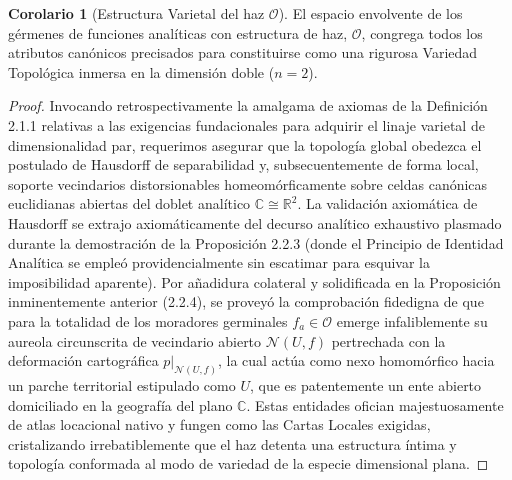 \documentclass[11pt,a4paper]{article}
\theoremstyle{definition}
\newtheorem{corolario}{Corolario}[section]
\theoremstyle{remark}
\numberwithin{equation}{section}
\begin{document}
\begin{corolario}[Estructura Varietal del haz $\mathcal{O}$]
El espacio envolvente de los gérmenes de funciones analíticas con estructura de haz, $\mathcal{O}$, congrega todos los atributos canónicos precisados para constituirse como una rigurosa Variedad Topológica inmersa en la dimensión doble ($n=2$).
\end{corolario}
\begin{proof}
Invocando retrospectivamente la amalgama de axiomas de la Definición 2.1.1 relativas a las exigencias fundacionales para adquirir el linaje varietal de dimensionalidad par, requerimos asegurar que la topología global obedezca el postulado de Hausdorff de separabilidad y, subsecuentemente de forma local, soporte vecindarios distorsionables homeomórficamente sobre celdas canónicas euclidianas abiertas del doblet analítico $\mathbb{C} \cong \mathbb{R}^2$.
La validación axiomática de Hausdorff se extrajo axiomáticamente del decurso analítico exhaustivo plasmado durante la demostración de la Proposición 2.2.3 (donde el Principio de Identidad Analítica se empleó providencialmente sin escatimar para esquivar la imposibilidad aparente).
Por añadidura colateral y solidificada en la Proposición inminentemente anterior (2.2.4), se proveyó la comprobación fidedigna de que para la totalidad de los moradores germinales $f_a \in \mathcal{O}$ emerge infaliblemente su aureola circunscrita de vecindario abierto $\mathcal{N}(U, f)$ pertrechada con la deformación cartográfica $p|_{\mathcal{N}(U, f)}$, la cual actúa como nexo homomórfico hacia un parche territorial estipulado como $U$, que es patentemente un ente abierto domiciliado en la geografía del plano $\mathbb{C}$. Estas entidades ofician majestuosamente de atlas locacional nativo y fungen como las Cartas Locales exigidas, cristalizando irrebatiblemente que el haz detenta una estructura íntima y topología conformada al modo de variedad de la especie dimensional plana.
\end{proof}
\end{document}

